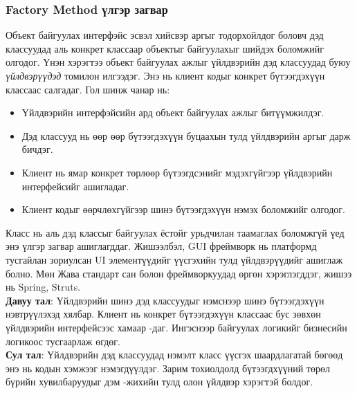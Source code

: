 \subsubsection{Factory Method үлгэр загвар}
\quad \quad Объект байгуулах интерфэйс эсвэл хийсвэр аргыг тодорхойлдог боловч дэд классуудад аль конкрет классаар объектыг байгуулахыг шийдэх боломжийг олгодог. Үнэн хэрэгтээ объект байгуулах ажлыг үйлдвэрийн дэд классуудад буюу \textit{үйлдвэрүүдэд} томилон илгээдэг. Энэ нь клиент кодыг конкрет бүтээгдэхүүн классаас салгадаг. Гол шинж чанар нь:
\begin{itemize}
	\item Үйлдвэрийн интерфэйсийн ард объект байгуулах ажлыг битүүмжилдэг.
	\item Дэд классууд нь өөр өөр бүтээгдэхүүн буцаахын тулд үйлдвэрийн аргыг дарж бичдэг.
	\item Клиент нь ямар конкрет төрлөөр бүтээгдсэнийг мэдэхгүйгээр үйлдвэрийн интерфейсийг ашигладаг.
	\item Клиент кодыг өөрчлөхгүйгээр шинэ бүтээгдэхүүн нэмэх боломжийг олгодог.
\end{itemize}
Класс нь аль дэд классыг байгуулах ёстойг урьдчилан таамаглах боломжгүй үед энэ үлгэр загвар ашиглагддаг. Жишээлбэл, GUI фреймворк нь платформд тусгайлан зориулсан UI элементүүдийг үүсгэхийн тулд үйлдвэрүүдийг ашиглаж болно. Мөн Жава стандарт сан болон фреймворкуудад өргөн хэрэглэгддэг, жишээ нь Spring, Struts.\\
\textbf{Давуу тал}: Үйлдвэрийн шинэ дэд классуудыг нэмснээр шинэ бүтээгдэхүүн нэвтрүүлэхэд хялбар. Клиент нь конкрет бүтээгдэхүүн классаас бус зөвхөн үйлдвэрийн интерфейсээс хамаар -даг. Ингэснээр байгуулах логикийг бизнесийн логикоос тусгаарлаж өгдөг.\\
\textbf{Сул тал}: Үйлдвэрийн дэд классуудад нэмэлт класс үүсгэх шаардлагатай бөгөөд энэ нь кодын хэмжээг нэмэгдүүлдэг. Зарим тохиолдолд бүтээгдхүүний төрөл бүрийн хувилбаруудыг дэм -жихийн тулд олон үйлдвэр хэрэгтэй болдог.

